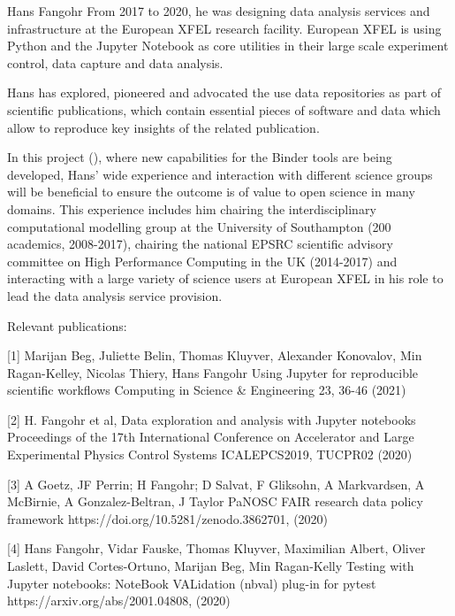 \begin{participant}[type=leadPI,PM=5,gender=male]{Hans Fangohr}
  From 2017 to 2020, he was designing data analysis services and
  infrastructure at the European XFEL research facility. European XFEL
  is using Python and the Jupyter Notebook as core utilities in their
  large scale experiment control, data capture and data
  analysis. 

  Hans has explored, pioneered and advocated the use data repositories as part
  of scientific publications, which contain essential pieces of software and
  data which allow to reproduce key insights of the related publication.

  In this project (\TheProject), where new capabilities for the Binder tools
  are being developed, Hans' wide experience and
  interaction with different science groups will be beneficial to
  ensure the outcome is of value to open science in many domains. This
  experience includes him chairing the interdisciplinary computational modelling
  group at the University of Southampton (200 academics, 2008-2017),
  chairing the national EPSRC scientific advisory committee on High
  Performance Computing in the UK (2014-2017) and interacting with a
  large variety of science users at European XFEL in his role
  to lead the data analysis service provision.

  Relevant publications:

  [1] Marijan Beg, Juliette Belin, Thomas Kluyver, Alexander Konovalov, Min Ragan-Kelley, Nicolas Thiery, Hans Fangohr
  Using Jupyter for reproducible scientific workflows 
  Computing in Science & Engineering 23, 36-46 (2021)

  [2] H. Fangohr et al, 
  Data exploration and analysis with Jupyter notebooks 
  Proceedings of the 17th International Conference on Accelerator and Large Experimental Physics Control Systems ICALEPCS2019, TUCPR02 (2020)

  [3] A Goetz, JF Perrin; H Fangohr; D Salvat, F Gliksohn, A Markvardsen, A McBirnie, A Gonzalez-Beltran, J Taylor
  PaNOSC FAIR research data policy framework 
  https://doi.org/10.5281/zenodo.3862701, (2020)

  [4] Hans Fangohr, Vidar Fauske, Thomas Kluyver, Maximilian Albert, Oliver Laslett, David Cortes-Ortuno, Marijan Beg, Min Ragan-Kelly
  Testing with Jupyter notebooks: NoteBook VALidation (nbval) plug-in for pytest 
  https://arxiv.org/abs/2001.04808, (2020)
\end{participant}

